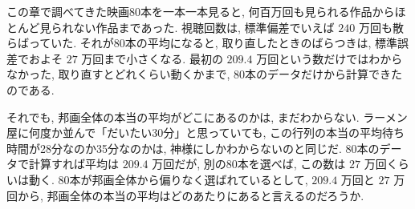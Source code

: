     この章で調べてきた映画80本を一本一本見ると, 何百万回も見られる作品からほとんど見られない作品まであった.
    視聴回数は, 標準偏差でいえば $240$ 万回も散らばっていた.
    それが80本の平均になると, 取り直したときのばらつきは, 標準誤差でおよそ $27$ 万回まで小さくなる.
    最初の $209.4$ 万回という数だけではわからなかった, 取り直すとどれくらい動くかまで, 80本のデータだけから計算できたのである.

    それでも, 邦画全体の本当の平均がどこにあるのかは, まだわからない.
    ラーメン屋に何度か並んで「だいたい30分」と思っていても, この行列の本当の平均待ち時間が28分なのか35分なのかは, 神様にしかわからないのと同じだ.
    80本のデータで計算すれば平均は $209.4$ 万回だが, 別の80本を選べば, この数は $27$ 万回くらいは動く.
    80本が邦画全体から偏りなく選ばれているとして, $209.4$ 万回と $27$ 万回から, 邦画全体の本当の平均はどのあたりにあると言えるのだろうか.
